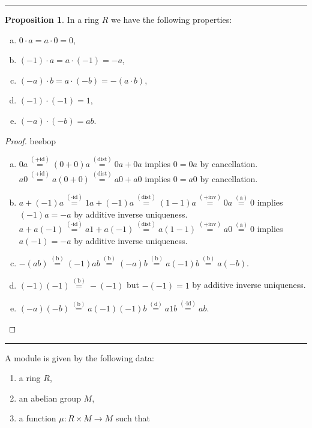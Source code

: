 \documentclass[12pt]{article}
\newcommand{\keyword}[1]{\textbf{#1}}
\newcommand{\sepline}{\rule{\textwidth}{0.4pt}}
\newenvironment{cd}{\begin{center}\begin{tikzcd}}{\end{tikzcd}\end{center}}
\theoremstyle{definition}
\newtheorem{proposition}{Proposition}
\newcommand{\<}{\left\langle}
\renewcommand{\>}{\right\rangle}
\newcommand{\eqby}[1]{\overset{\mathrm{(#1)}}{=}}
\DeclareMathOperator{\id}{id}
\begin{document}
\sepline


\begin{proposition}
    In a ring $R$ we have the following properties:
    \begin{enumerate}[(a)]
        \item $0 \cdot a = a \cdot 0 = 0$,
        \item $(-1) \cdot a = a \cdot (-1) = -a$,
        \item $(-a) \cdot b = a \cdot (-b) = -(a \cdot b)$,
        \item $(-1) \cdot (-1) = 1$,
        \item $(-a) \cdot (-b) = ab$.
    \end{enumerate}
\end{proposition}
\begin{proof}
    beebop
    \begin{enumerate}[(a)]
        \item $0a \eqby{+ id} (0 + 0)a \eqby{dist} 0a + 0a$ implies $0 = 0a$ by cancellation. \\
        $a0 \eqby{+ id} a(0 + 0) \eqby{dist} a0 + a0$ implies $0 = a0$ by cancellation.
        \item $a + (-1)a \eqby{\cdot id} 1a + (-1)a \eqby{dist} (1 - 1)a \eqby{+inv} 0a \eqby{a} 0$ implies $(-1)a = -a$ by additive inverse uniqueness. \\
        $a + a(-1) \eqby{\cdot id} a1 + a(-1) \eqby{dist} a(1 - 1) \eqby{+inv} a0 \eqby{a} 0$ implies $a(-1) = -a$ by additive inverse uniqueness.
        \item $-(ab) \eqby{b} (-1)ab \eqby{b} (-a)b \eqby{b} a(-1)b \eqby{b} a(-b)$.
        \item $(-1)(-1) \eqby{b} -(-1)$ but $-(-1) = 1$ by additive inverse uniqueness.
        \item $(-a)(-b) \eqby{b} a(-1)(-1)b \eqby{d} a1b \eqby{\cdot id} ab$.
    \end{enumerate}
\end{proof}

\sepline

A \keyword{}{module} is given by the following data:
\begin{enumerate}[(1)]
    \item a ring $R$,
    \item an abelian group $M$,
    \item a function $\mu : R \times M \to M$ such that
\end{enumerate} 
\end{document}
